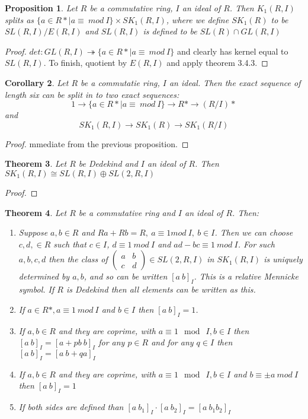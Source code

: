 \documentclass[a4paper,10pt]{article}
\newtheorem{thm}{Theorem}[subsection]
\newtheorem{prop}[thm]{Proposition}
\newtheorem{cor}[thm]{Corollary}
\begin{document}
\begin{prop}
Let $R$ be a commutative ring, $I$ an ideal of $R$. Then $K_{1}(R,I)$ splits as $\{a\in R*|a\equiv \ mod\ I\}\times SK_{1}(R,I)$, where we define $SK_{1}(R)$ to be $SL(R,I)/E(R,I)$ and $SL(R,I)$ is defined to be $SL(R)\cap GL(R,I)$
\end{prop}
\begin{proof}
$det:GL(R,I)\twoheadrightarrow \{a\in R*|a\equiv \ mod\ I\}$ and clearly has kernel equal to $SL(R,I)$. To finish, quotient by $E(R,I)$ and apply theorem 3.4.3.
\end{proof}

\begin{cor}
Let $R$ be a commutatie ring, $I$ an ideal. Then the exact sequence of length six can be split in to two exact sequences:
$$1\rightarrow \{a\in R*|a\equiv \ mod\ I\}\rightarrow R* \rightarrow (R/I)*$$ and
$$SK_{1}(R,I)\rightarrow SK_{1}(R) \rightarrow SK_{1}(R/I)$$
\end{cor}
\begin{proof}
mmediate from the previous proposition.
\end{proof}

\begin{thm}
Let $R$ be Dedekind and $I$ an ideal of $R$. Then $SK_{1}(R,I)\cong SL(R,I)\oplus SL(2,R,I)$
\end{thm}
\begin{proof}

\end{proof}

\begin{thm}
Let $R$ be a commutative ring and $I$ an ideal of $R$. Then:
\begin{enumerate}
 \item Suppose $a,b\in R$ and $Ra+Rb=R,\ a\equiv 1 mod\ I,\ b\in I$. Then we can choose $c,d,\in R$ such that $c\in I$, $d\equiv 1\ mod\ I$ and $ad-bc\equiv 1\ mod \ I$. For such $a,b,c,d$ then the class of $\begin{pmatrix} a & b \\ c & d \end{pmatrix}\in SL(2,R,I)$ in $SK_{1}(R,I)$ is uniquely determined by $a,b$, and so can be written $[a\ b]_{I}$. This is a relative Mennicke symbol. If $R$ is Dedekind then all elements can be written as this.
 \item If $a\in R*,a\equiv 1\ mod\ I$ and $b\in I$ then $[a\ b]_{I}=1$.
 \item If $a,b\in R$ and they are coprime, with $a\equiv 1\mod \ I,b\in I$ then $[a\ b]_{I}=[a+pb\ b]_{I}$ for any $p\in R$ and for any $q\in I$ then $[a\ b]_{I}=[a\ b+qa]_{I}$
 \item If $a,b\in R$ and they are coprime, with $a\equiv 1\mod \ I,b\in I$ and $b\equiv \pm a\ mod\ I$ then $[a\ b]_{I}=1$
 \item If both sides are defined than $[a\ b_{1}]_{I}\cdot [a\ b_{2}]_{I}=[a\ b_{1}b_{2}]_{I}$
\end{enumerate}
\end{thm}
\end{document}
